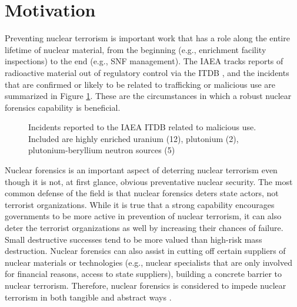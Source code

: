 \section{Motivation}
\label{sec:motivation}

Preventing nuclear terrorism is important work that has a role along the entire
lifetime of nuclear material, from the beginning (e.g., enrichment facility
inspections) to the end (e.g., \gls{SNF} management). The \gls{IAEA} tracks
reports of radioactive material out of regulatory control via the \gls{ITDB}
\cite{itdb}, and the incidents that are confirmed or likely to be related to
trafficking or malicious use are summarized in Figure \ref{fig:incidents}.
These are the circumstances in which a robust nuclear forensics capability is
beneficial.

\begin{figure}[!tbh]
  \caption{Incidents reported to the \acrshort{IAEA} \acrshort{ITDB} related to 
           malicious use. Included are highly enriched uranium (12), 
           plutonium (2), plutonium-beryllium neutron sources (5) 
           \cite{itdb}}
  \label{fig:incidents}
\end{figure}

Nuclear forensics is an important aspect of deterring nuclear terrorism even
though it is not, at first glance, obvious preventative nuclear security.  The
most common defense of the field is that nuclear forensics deters state actors,
not terrorist organizations. While it is true that a strong capability
encourages governments to be more active in prevention of nuclear terrorism, it
can also deter the terrorist organizations as well by increasing their chances
of failure. Small destructive successes tend to be more valued than high-risk
mass destruction. Nuclear forensics can also assist in cutting off certain
suppliers of nuclear materials or technologies (e.g., nuclear specialists that
are only involved for financial reasons, access to state suppliers), building a
concrete barrier to nuclear terrorism.  Therefore, nuclear forensics is
considered to impede nuclear terrorism in both tangible and abstract ways
\cite{aps_aaas_forensics}.

